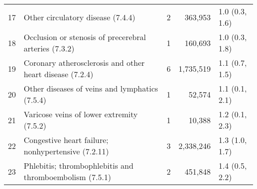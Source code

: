 \begin{tabular}{lp{6.5cm}rrp{2.2cm}}
  17 & Other circulatory disease (7.4.4) &  2 & 363,953 & 1.0 (0.3, 1.6) \\ 
  18 & Occlusion or stenosis of precerebral arteries (7.3.2) &  1 & 160,693 & 1.0 (0.3, 1.8) \\ 
  19 & Coronary atherosclerosis and other heart disease (7.2.4) &  6 & 1,735,519 & 1.1 (0.7, 1.5) \\ 
  20 & Other diseases of veins and lymphatics (7.5.4) &  1 & 52,574 & 1.1 (0.1, 2.1) \\ 
  21 & Varicose veins of lower extremity (7.5.2) &  1 & 10,388 & 1.2 (0.1, 2.3) \\ 
  22 & Congestive heart failure; nonhypertensive (7.2.11) &  3 & 2,338,246 & 1.3 (1.0, 1.7) \\ 
  23 & Phlebitis; thrombophlebitis and thromboembolism (7.5.1) &  2 & 451,848 & 1.4 (0.5, 2.2) \\ 
   \hline
\end{tabular}

